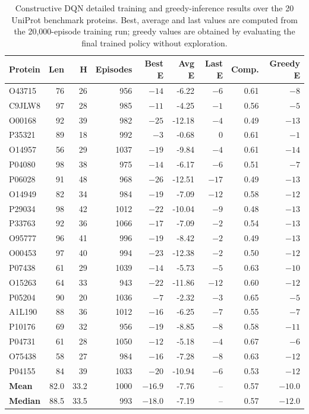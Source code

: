 \begin{table}[!htbp]
\centering
\caption[Constructive DQN detailed results]{Constructive DQN detailed training and greedy-inference results over the 20 UniProt benchmark proteins. Best, average and last values are computed from the 20,000-episode training run; greedy values are obtained by evaluating the final trained policy without exploration.}
\label{tab:dqn_detailed_results}
\scriptsize
\begin{tabular}{lrrrrrrrr}
\hline
\textbf{Protein} & \textbf{Len} & \textbf{H} & \textbf{Episodes} & \textbf{Best E} & \textbf{Avg E} & \textbf{Last E} & \textbf{Comp.} & \textbf{Greedy E} \\
\hline
O43715 & 76 & 26 & 956 & $-14$ & -6.22 & $-6$ & 0.61 & $-8$ \\
C9JLW8 & 97 & 28 & 985 & $-11$ & -4.25 & $-1$ & 0.56 & $-5$ \\
O00168 & 92 & 39 & 982 & $-25$ & -12.18 & $-4$ & 0.49 & $-13$ \\
P35321 & 89 & 18 & 992 & $-3$ & -0.68 & $0$ & 0.61 & $-1$ \\
O14957 & 56 & 29 & 1037 & $-19$ & -9.84 & $-4$ & 0.61 & $-14$ \\
P04080 & 98 & 38 & 975 & $-14$ & -6.17 & $-6$ & 0.51 & $-7$ \\
P06028 & 91 & 48 & 968 & $-26$ & -12.51 & $-17$ & 0.49 & $-13$ \\
O14949 & 82 & 34 & 984 & $-19$ & -7.09 & $-12$ & 0.58 & $-12$ \\
P29034 & 98 & 42 & 1012 & $-22$ & -10.04 & $-9$ & 0.48 & $-13$ \\
P33763 & 92 & 36 & 1066 & $-17$ & -7.09 & $-2$ & 0.54 & $-13$ \\
O95777 & 96 & 41 & 996 & $-19$ & -8.42 & $-2$ & 0.49 & $-13$ \\
O00453 & 97 & 40 & 994 & $-23$ & -12.38 & $-2$ & 0.50 & $-12$ \\
P07438 & 61 & 29 & 1039 & $-14$ & -5.73 & $-5$ & 0.63 & $-10$ \\
O15263 & 64 & 33 & 943 & $-22$ & -11.86 & $-12$ & 0.60 & $-12$ \\
P05204 & 90 & 20 & 1036 & $-7$ & -2.32 & $-3$ & 0.65 & $-5$ \\
A1L190 & 88 & 36 & 1012 & $-16$ & -6.25 & $-7$ & 0.55 & $-7$ \\
P10176 & 69 & 32 & 956 & $-19$ & -8.85 & $-8$ & 0.58 & $-11$ \\
P04731 & 61 & 28 & 1050 & $-12$ & -5.18 & $-4$ & 0.67 & $-6$ \\
O75438 & 58 & 27 & 984 & $-16$ & -7.28 & $-8$ & 0.63 & $-12$ \\
P04155 & 84 & 39 & 1033 & $-20$ & -10.94 & $-6$ & 0.53 & $-12$ \\
\hline
\textbf{Mean} & 82.0 & 33.2 & 1000 & $-16.9$ & -7.76 & -- & 0.57 & $-10.0$ \\
\textbf{Median} & 88.5 & 33.5 & 993 & $-18.0$ & -7.19 & -- & 0.57 & $-12.0$ \\
\hline
\end{tabular}
\end{table}
\FloatBarrier


